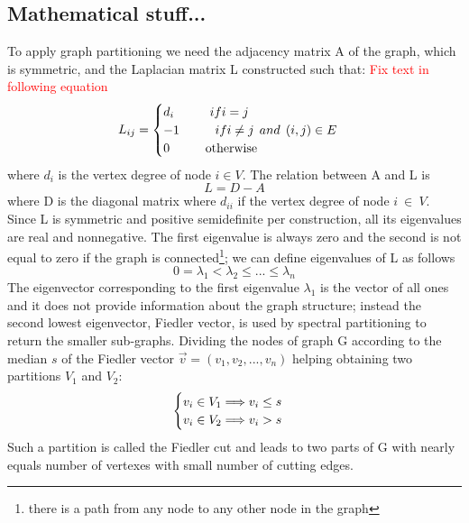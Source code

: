 \documentclass[12 pt]{article}
\newcommand\tab[1][1cm]{\hspace*{#1}}
\begin{document}
\subsection{Mathematical stuff...}
To apply graph partitioning we need the adjacency matrix A of the graph, which is symmetric, and the Laplacian matrix L constructed such that: \textcolor{red}{Fix text in following equation}
\begin{equation}\notag
L_{ij} = 
\begin{cases}
d_i \tab if i=j \\
-1 \tab if i \neq j \:\: and \: \: (i,j) \in E \\
0 \tab \text{otherwise}
\end{cases}
\end{equation}
where $d_i$ is the vertex degree of node $i \in V$.
The relation between A and L is
$$L = D - A$$
where D is the diagonal matrix where $d_{ii}$ if the vertex degree of node $i~\in~V$. Since L is symmetric and positive semidefinite per construction, all its eigenvalues are real and nonnegative. The first eigenvalue is always zero and the second is not equal to zero if the graph is connected\footnote{there is a path from any node to any other node in the graph}; we can define eigenvalues of L as follows
$$ 0 = \lambda_1 < \lambda_2 \leq ... \leq \lambda_n$$
The eigenvector corresponding to the first eigenvalue $\lambda_1$ is the vector of all ones and it does not provide information about the graph structure; instead the second lowest eigenvector, Fiedler vector, is used by spectral partitioning to return the smaller sub-graphs. Dividing the nodes of graph G according to the median $s$ of the Fiedler vector $\vec{v} = (v_1,v_2,...,v_n)$ helping obtaining two partitions $V_1$ and $V_2$:
\begin{equation}\notag
\begin{cases}
v_i \in V_1 \Longrightarrow v_i \leq s \\
v_i \in V_2 \Longrightarrow v_i > s
\end{cases}
\end{equation}
Such a partition is called the Fiedler cut and leads to two parts of G with nearly equals number of vertexes with small number of cutting edges.
\end{document}
